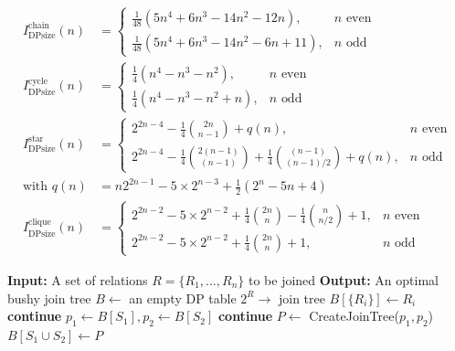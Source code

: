\documentclass[12pt]{article}
\begin{document}
\begin{flushleft}
\begin{align*}
    I^{\text{chain}}_{\text{DPsize}}(n) &=
    \begin{cases}
        \frac{1}{48} (5n^4 + 6n^3 - 14n^2 - 12n), & n \text{ even} \\
        \frac{1}{48} (5n^4 + 6n^3 - 14n^2 - 6n + 11), & n \text{ odd}
    \end{cases}
    \\
    I^{\text{cycle}}_{\text{DPsize}}(n) &=
    \begin{cases}
        \frac{1}{4} (n^4 - n^3 - n^2), & n \text{ even} \\
        \frac{1}{4} (n^4 - n^3 - n^2 + n), & n \text{ odd}
    \end{cases}
    \\
    I^{\text{star}}_{\text{DPsize}}(n) &=
    \begin{cases}
        2^{2n-4} - \frac{1}{4} \binom{2n}{n-1} + q(n), & n \text{ even} \\
        2^{2n-4} - \frac{1}{4} \binom{2(n-1)}{(n-1)} + \frac{1}{4} \binom{(n-1)}{(n-1)/2} + q(n), & n \text{ odd}
    \end{cases}
    \\
    \text{with } q(n) &= n 2^{2n-1} - 5 \times 2^{n-3} + \frac{1}{2} (2^n - 5n + 4)
    \\
    I^{\text{clique}}_{\text{DPsize}}(n) &=
    \begin{cases}
        2^{2n-2} - 5 \times 2^{n-2} + \frac{1}{4} \binom{2n}{n} - \frac{1}{4} \binom{n}{n/2} + 1, & n \text{ even} \\
        2^{2n-2} - 5 \times 2^{n-2} + \frac{1}{4} \binom{2n}{n} + 1, & n \text{ odd}
    \end{cases}
\end{align*}

\begin{algorithm}[H]
    \begin{algorithmic}[1]
        \State \textbf{Input:} A set of relations $R = \{R_1, \dots, R_n\}$ to be joined
        \State \textbf{Output:} An optimal bushy join tree
        \State $B \gets$ an empty DP table $2^R \to$ join tree
            \State $B[\{R_i\}] \gets R_i$
        \EndFor
                    \State \textbf{continue}
                \EndIf
                \State $p_1 \gets B[S_1], p_2 \gets B[S_2]$
                 \textbf{continue} \EndIf
                \State $P \gets$ CreateJoinTree($p_1, p_2$)
                    \State $B[S_1 \cup S_2] \gets P$
                \EndIf
            \EndFor
        \EndFor
    \end{algorithmic}
\end{algorithm}


\end{flushleft}
\end{document}
